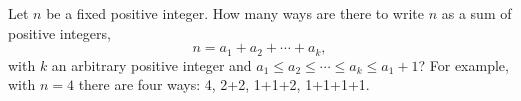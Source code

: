 Let $n$ be a fixed positive integer. How many ways are there to write  $n$
as a sum of positive integers,  
\[
n = a_1 + a_2 + \cdots + a_k,
\]
with  $k$  an
arbitrary positive integer and  $a_1 \le a_2 \le \cdots \le a_k \le a_1  + 1$?
For example, with $n=4$ there are four ways: 4, 2+2, 1+1+2, 1+1+1+1.
